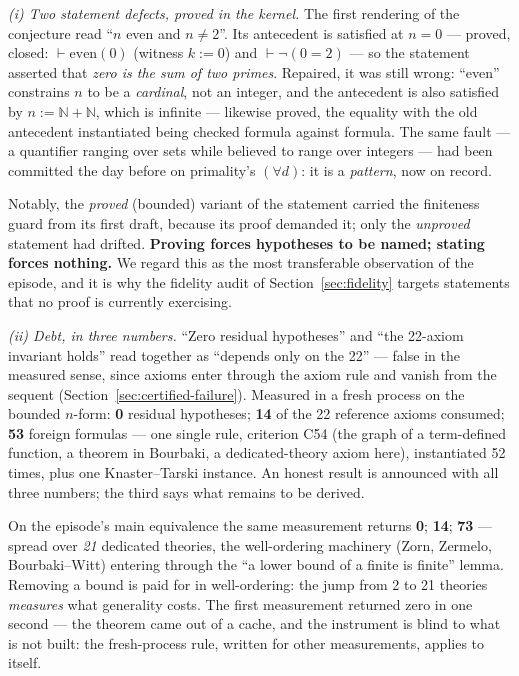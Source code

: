 \documentclass[11pt]{article}
\theoremstyle{remark}\newtheorem{example}{Example}
\begin{document}
\emph{(i) Two statement defects, proved in the kernel.} The first rendering of the
conjecture read ``$n$ even and $n \neq 2$''. Its antecedent is satisfied at $n = 0$ ---
proved, closed: $\vdash \mathrm{even}(0)$ (witness $k := 0$) and $\vdash \neg(0 = 2)$ ---
so the statement asserted that \emph{zero is the sum of two primes}. Repaired, it was
still wrong: ``even'' constrains $n$ to be a \emph{cardinal}, not an integer, and the
antecedent is also satisfied by $n := \mathbb{N} + \mathbb{N}$, which is infinite ---
likewise proved, the equality with the old antecedent instantiated being checked formula
against formula. The same fault --- a quantifier ranging over sets while believed to
range over integers --- had been committed the day before on primality's $(\forall d)$:
it is a \emph{pattern}, now on record.

Notably, the \emph{proved} (bounded) variant of the statement carried the finiteness
guard from its first draft, because its proof demanded it; only the \emph{unproved}
statement had drifted. \textbf{Proving forces hypotheses to be named; stating forces
nothing.} We regard this as the most transferable observation of the episode, and it is
why the fidelity audit of Section~\ref{sec:fidelity} targets statements that no proof
is currently exercising.

\emph{(ii) Debt, in three numbers.} ``Zero residual hypotheses'' and ``the 22-axiom
invariant holds'' read together as ``depends only on the 22'' --- false in the measured
sense, since axioms enter through the $\mathrm{axiom}$ rule and vanish from the sequent
(Section~\ref{sec:certified-failure}). Measured in a fresh process on the bounded
$n$-form: \textbf{0} residual hypotheses; \textbf{14} of the 22 reference axioms
consumed; \textbf{53} foreign formulas --- one single rule, criterion C54 (the graph of a
term-defined function, a theorem in Bourbaki, a dedicated-theory axiom here),
instantiated 52 times, plus one Knaster--Tarski instance. An honest result is announced
with all three numbers; the third says what remains to be derived.

On the episode's main equivalence the same measurement returns \textbf{0}; \textbf{14};
\textbf{73} --- spread over \emph{21} dedicated theories, the well-ordering machinery
(Zorn, Zermelo, Bourbaki--Witt) entering through the ``a lower bound of a finite is
finite'' lemma. Removing a bound is paid for in well-ordering: the jump from 2 to 21
theories \emph{measures} what generality costs. The first measurement returned zero in
one second --- the theorem came out of a cache, and the instrument is blind to what is
not built: the fresh-process rule, written for other measurements, applies to itself.
\end{document}
